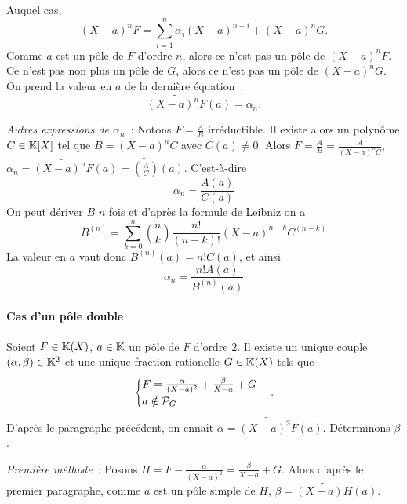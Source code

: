 Auquel cas,
\begin{equation}
  (X-a)^nF = \sum_{i=1}^n \alpha_i(X-a)^{n-i} +(X-a)^nG.
\end{equation}
Comme $a$ est un pôle de $F$ d'ordre $n$, alors ce n'est pas un pôle de $(X-a)^nF$. Ce n'est pas non plus un pôle de $G$, alors ce n'est pas un pôle de $(X-a)^nG$. On prend la valeur en $a$ de la dernière équation~:
\begin{equation}
  \widetilde{(X-a)^nF}(a)=\alpha_n.
\end{equation}

\emph{Autres expressions de $\alpha_n$}~: Notons $F=\frac{A}{B}$ irréductible. Il existe alors un polynôme $C \in \K[X]$ tel que $B=(X-a)^nC$ avec $C(a)\neq 0$. Alors $F=\frac{A}{B}=\frac{A}{(X-a)^nC}$, $\alpha_n = \widetilde{(X-a)^nF}(a)=\widetilde{\left(\frac{A}{C}\right)}(a)$. C'est-à-dire
\begin{equation}
  \alpha_n=\frac{A(a)}{C(a)}
\end{equation}
On peut dériver $B$ $n$ fois et d'après la formule de Leibniz on a
\begin{equation}
  B^{(n)} = \sum_{k=0}^n \binom{n}{k} \frac{n!}{(n-k)!}(X-a)^{n-k}C^{(n-k)}
\end{equation}
La valeur en $a$ vaut donc $B^{(n)}(a)=n! C(a)$, et ainsi
\begin{equation}
  \alpha_n = \frac{n! A(a)}{B^{(n)}(a)}
\end{equation}

\paragraph{Cas d'un pôle double}

Soient $F \in \K(X)$, $a\in\K$ un pôle de $F$ d'ordre $2$. Il existe un unique couple $(\alpha,\beta) \in \K^2$ et une unique fraction rationelle $G \in \K(X)$ tels que
\begin{equation}
  \begin{cases}
    F = \frac{\alpha}{(X-a)^2}+\frac{\beta}{X-a}+G \\
    a \notin \P_G
  \end{cases}.
\end{equation}
D'après le paragraphe précédent, on cnnaît $\alpha=\widetilde{(X-a)^2F}(a)$. Déterminons $\beta$.

\emph{Première méthode}~: Posons $H=F-\frac{\alpha}{(X-a)^2}=\frac{\beta}{X-a}+G$. Alors d'après le premier paragraphe, comme $a$ est un pôle simple de $H$, $\beta=\widetilde{(X-a)H}(a)$.

